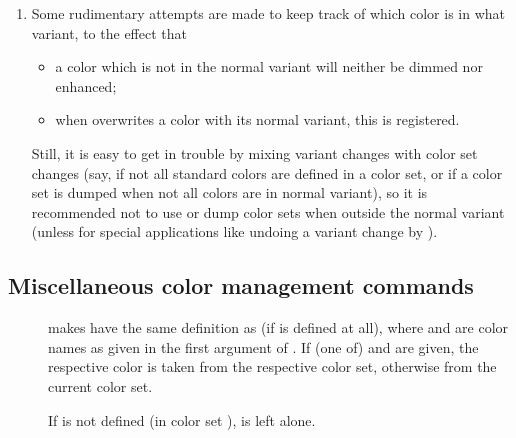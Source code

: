 \begin{slide}
\begin{enumerate}
\begin{itemize}
      At the very beginning of a  command, \TeX Power executes ,
      so you can restore the colors anywhere in the argument of  by saying
      .
    \end{itemize}

    \newslide

  \item Some rudimentary attempts are made to keep track of which color is in what variant, to the effect that
    \begin{itemize}
    \item a color which is not in the normal variant will neither be dimmed nor enhanced;
    \item when  overwrites a color with its normal variant, this is registered.
    \end{itemize}
    Still, it is easy to get in trouble by mixing variant changes with color set changes (say, if not all standard
    colors are defined in a color set, or if a color set is dumped when not all colors are in normal variant), so it is
    recommended not to use or dump color sets when outside the normal variant (unless for special applications like
    undoing a variant change by ).
  \end{enumerate}


    \newslide

  \subsection{Miscellaneous color management commands}\label{Sec:MiscColorCommands}
  \begin{description}
  \item[]
    \indexmacro{} makes
     have the same definition as  (if  is defined at all), where 
    and  are color names as given in the first argument of .  If (one of)
     and  are given, the respective color is taken from the respective color set, otherwise from
    the current color set.

    If  is not defined (in color set ),  is left alone.

    \newslide


\end{description}
\end{slide}
